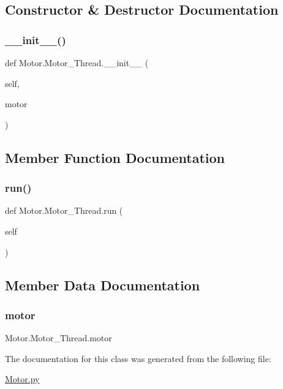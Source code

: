 \subsection{Constructor \& Destructor Documentation}
\mbox{\label{class_motor_1_1_motor___thread_a5610243ba8010e6b71669361f8d9f005}} 
\subsubsection{\texorpdfstring{\+\_\+\+\_\+init\+\_\+\+\_\+()}{\_\_init\_\_()}}
{\footnotesize\ttfamily def Motor.\+Motor\+\_\+\+Thread.\+\_\+\+\_\+init\+\_\+\+\_\+ (\begin{DoxyParamCaption}\item[{}]{self,  }\item[{}]{motor }\end{DoxyParamCaption})}



\subsection{Member Function Documentation}
\mbox{\label{class_motor_1_1_motor___thread_a940954129ae966e7250b3335d4a78f1d}} 
\subsubsection{\texorpdfstring{run()}{run()}}
{\footnotesize\ttfamily def Motor.\+Motor\+\_\+\+Thread.\+run (\begin{DoxyParamCaption}\item[{}]{self }\end{DoxyParamCaption})}



\subsection{Member Data Documentation}
\mbox{\label{class_motor_1_1_motor___thread_a67c6a328eb97c9a8ea0524b43a29f15c}} 
\subsubsection{\texorpdfstring{motor}{motor}}
{\footnotesize\ttfamily Motor.\+Motor\+\_\+\+Thread.\+motor}



The documentation for this class was generated from the following file\+:\begin{DoxyCompactItemize}
\item 
\mbox{\hyperlink{_motor_8py}{Motor.\+py}}\end{DoxyCompactItemize}

